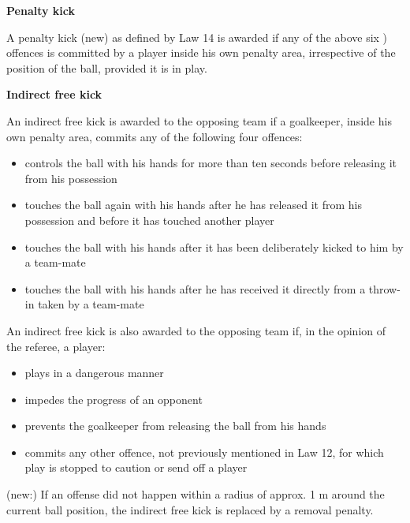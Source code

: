 \bigskip

{\bfseries Penalty kick}

\headlinebox

A penalty kick (new) as defined by Law 14 is awarded if any of the above six
) offences is committed by a player inside his own penalty area,
irrespective of the position of the ball, provided it is in play.


\bigskip

{\bfseries Indirect free kick}

\headlinebox

An indirect free kick is awarded to the opposing team if a goalkeeper, inside his own penalty area, commits any of the following four offences: 

\begin{itemize}
\item controls the ball with his hands for more than ten seconds before releasing it from his possession
\item touches the ball again with his hands after he has released it from his possession and before it has touched another player
\item touches the ball with his hands after it has been deliberately kicked to him by a team-mate
\item touches the ball with his hands after he has received it directly from a throw-in taken by a team-mate
\end{itemize}

\bigskip

An indirect free kick is also awarded to the opposing team if, in the opinion of the referee, a player:

\begin{itemize}
\item plays in a dangerous manner
\item impedes the progress of an opponent
\item prevents the goalkeeper from releasing the ball from his hands
\item commits any other offence, not previously mentioned in Law 12, for which play is stopped to caution or send off a player
\end{itemize}

\bigskip

(new:) If an offense did not happen within a radius of approx. 1 m around the current ball position, the indirect free kick is replaced by a removal penalty.

\bigskip


